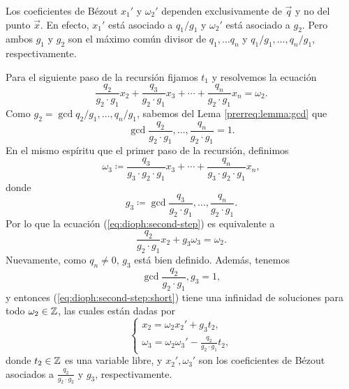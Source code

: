 \begin{observation}
	Los coeficientes de Bézout $x_1'$ y $\omega_2'$ dependen exclusivamente de $\vec{q}$ y no del
	punto $\vec{x}$. En efecto, $x_1'$ está asociado a $q_1/g_1$ y $\omega_2'$ está asociado a
	$g_2$. Pero ambos $g_1$ y $g_2$ son el máximo común divisor de $q_1, \ldots q_n$ y
	$q_1/g_1, \ldots, q_n/g_1$, respectivamente. 
\end{observation}

Para el siguiente paso de la recursión fijamos $t_1$ y resolvemos la ecuación
\begin{equation}
	\label{eq:dioph:second-step}
	\frac{q_2}{g_2 \cdot g_1}x_2 +
	\frac{q_3}{g_2 \cdot g_1}x_3 +
	\cdots +
	\frac{q_n}{g_2 \cdot g_1}x_n
	= \omega_2.
\end{equation}
Como $g_2 = \gcd{q_2/g_1, \ldots, q_n/g_1}$, sabemos del Lema \ref{prerreq:lemma:gcd}
que
\begin{equation*}
	\gcd{\frac{q_2}{g_2 \cdot g_1}, \ldots, \frac{q_n}{g_2 \cdot g_1}} = 1.
\end{equation*}
En el mismo espíritu que el primer paso de la recursión, definimos
\begin{equation*}
	\omega_3 \coloneq \frac{q_3}{g_3 \cdot g_2 \cdot g_1}x_3 + \cdots + \frac{q_n}{g_3
	\cdot g_2 \cdot g_1}x_n,
\end{equation*}
donde
\begin{equation*}
	g_3 \coloneq  \gcd{\frac{q_3}{g_2 \cdot g_1}, \ldots, \frac{q_n}{g_2 \cdot g_1}}.
\end{equation*}
Por lo que la ecuación (\ref{eq:dioph:second-step}) es equivalente a
\begin{equation}
	\label{eq:dioph:second-step:short}
	\frac{q_2}{g_2 \cdot g_1}x_2 + g_3\omega_3 = \omega_2.
\end{equation}
Nuevamente, como $q_n \neq 0$, $g_3$ está bien definido. Además, tenemos
\begin{equation*}
	\gcd{\frac{q_2}{g_2 \cdot g_1}, g_3} = 1,
\end{equation*}
y entonces (\ref{eq:dioph:second-step:short}) tiene una infinidad de soluciones para todo $\omega_2 \in
\mathbb{Z}$, las cuales están dadas por
\begin{equation*}
	\begin{cases}
		x_2 = \omega_2x_2' + g_3t_2, \\
		\omega_3 = \omega_2\omega_3' - \frac{q_2}{g_2 \cdot g_1}t_2,
	\end{cases}
\end{equation*}
donde $t_2 \in \mathbb{Z}$ es una variable libre, y $x_2', \omega_3'$ son los coeficientes de Bézout
asociados a $\frac{q_2}{g_2 \cdot g_2}$ y $g_3$, respectivamente.

